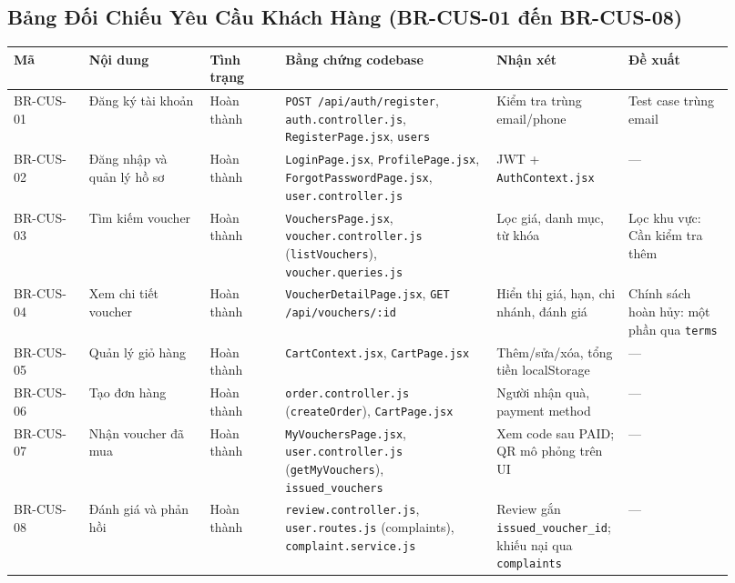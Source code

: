 \subsection{Bảng Đối Chiếu Yêu Cầu Khách Hàng (BR-CUS-01 đến BR-CUS-08)}
\begin{longtable}{>{\raggedright\arraybackslash}p{0.10\linewidth}>{\raggedright\arraybackslash}p{0.16\linewidth}>{\raggedright\arraybackslash}p{0.10\linewidth}>{\raggedright\arraybackslash}p{0.28\linewidth}>{\raggedright\arraybackslash}p{0.14\linewidth}>{\raggedright\arraybackslash}p{0.14\linewidth}}
\toprule
\textbf{Mã} & \textbf{Nội dung} & \textbf{Tình trạng} & \textbf{Bằng chứng codebase} & \textbf{Nhận xét} & \textbf{Đề xuất}\\
\midrule
\endhead
BR-CUS-01 & Đăng ký tài khoản & Hoàn thành & \texttt{POST /api/auth/register}, \texttt{auth.controller.js}, \texttt{RegisterPage.jsx}, \texttt{users} & Kiểm tra trùng email/phone & Test case trùng email\\
BR-CUS-02 & Đăng nhập và quản lý hồ sơ & Hoàn thành & \texttt{LoginPage.jsx}, \texttt{ProfilePage.jsx}, \texttt{ForgotPasswordPage.jsx}, \texttt{user.controller.js} & JWT + \texttt{AuthContext.jsx} & —\\
BR-CUS-03 & Tìm kiếm voucher & Hoàn thành & \texttt{VouchersPage.jsx}, \texttt{voucher.controller.js} (\texttt{listVouchers}), \texttt{voucher.queries.js} & Lọc giá, danh mục, từ khóa & Lọc khu vực: Cần kiểm tra thêm\\
BR-CUS-04 & Xem chi tiết voucher & Hoàn thành & \texttt{VoucherDetailPage.jsx}, \texttt{GET /api/vouchers/:id} & Hiển thị giá, hạn, chi nhánh, đánh giá & Chính sách hoàn hủy: một phần qua \texttt{terms}\\
BR-CUS-05 & Quản lý giỏ hàng & Hoàn thành & \texttt{CartContext.jsx}, \texttt{CartPage.jsx} & Thêm/sửa/xóa, tổng tiền localStorage & —\\
BR-CUS-06 & Tạo đơn hàng & Hoàn thành & \texttt{order.controller.js} (\texttt{createOrder}), \texttt{CartPage.jsx} & Người nhận quà, payment method & —\\
BR-CUS-07 & Nhận voucher đã mua & Hoàn thành & \texttt{MyVouchersPage.jsx}, \texttt{user.controller.js} (\texttt{getMyVouchers}), \texttt{issued\_vouchers} & Xem code sau PAID; QR mô phỏng trên UI & —\\
BR-CUS-08 & Đánh giá và phản hồi & Hoàn thành & \texttt{review.controller.js}, \texttt{user.routes.js} (complaints), \texttt{complaint.service.js} & Review gắn \texttt{issued\_voucher\_id}; khiếu nại qua \texttt{complaints} & —\\
\bottomrule
\end{longtable}

